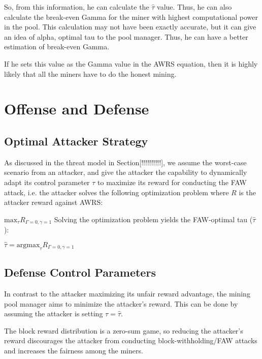 \documentclass[runningheads]{llncs}
\begin{document}
So, from this information, he can calculate the $\hat{\tau}$ value. Thus, he can also calculate the break-even Gamma for the miner with highest computational power in the pool. This calculation may not have been exactly accurate, but it can give an idea of alpha, optimal tau to the pool manager. Thus, he can have a better estimation of break-even Gamma.

If he sets this value as the Gamma value in the AWRS equation, then it is highly likely that all the miners have to do the honest mining.   


\section{Offense and Defense}
\subsection{Optimal Attacker Strategy}

As discussed in the threat model in Section[!!!!!!!!!!], we assume the worst-case scenario from an attacker, and give the attacker the capability to dynamically adapt its control parameter $\tau$ to maximize its reward for conducting the FAW attack, i.e. the attacker solves the following optimization problem where $R$ is the attacker reward against AWRS: 

$\mbox{max}_{\tau} R_{\Gamma=0,\gamma=1}$
Solving the optimization problem yields the FAW-optimal tau ($\hat{\tau}$): 

$\hat{\tau}  =  \mbox{argmax}_{\tau} R_{\Gamma=0,\gamma=1}$






\subsection{Defense Control Parameters}


In contrast to the attacker maximizing its unfair reward advantage, the mining pool manager aims to minimize the attacker's reward. This can be done by assuming the attacker is setting $\tau=\hat{\tau}$.

The block reward distribution is a zero-sum game, so reducing the attacker's reward discourages the attacker from conducting block-withholding/FAW attacks and increases the fairness among the miners. 
\end{document}
